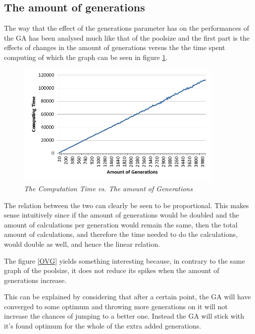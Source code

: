 \subsection{The amount of generations}

\par
The way that the effect of the generations parameter has on the performances of the GA has been analysed much like that of the poolsize and the first part is the effects of changes in the amount of generations versus the the time spent computing of which the graph can be seen in figure \ref{CTG}.

\begin{figure}[h] 
	\centering
	\includegraphics[height=6cm]{CTG}
	\caption{\textsl{The Computation Time vs. The amount of Generations}}
	\label{CTG}
\end{figure}

\par
The relation between the two can clearly be seen to be proportional. This makes sense intuitively since if the amount of generations would be doubled and the amount of calculations per generation would remain the same, then the total amount of calculations, and therefore the time needed to do the calculations, would double as well, and hence the linear relation.

The figure \ref{OVG} yields something interesting because, in contrary to the same graph of the poolsize, it does not reduce its spikes when the amount of generations increase.

\par
This can be explained by considering that after a certain point, the GA will have converged to some optimum and throwing more generations on it will not increase the chances of jumping to a better one. Instead the GA will stick with it’s found optimum for the whole of the extra added generations.


